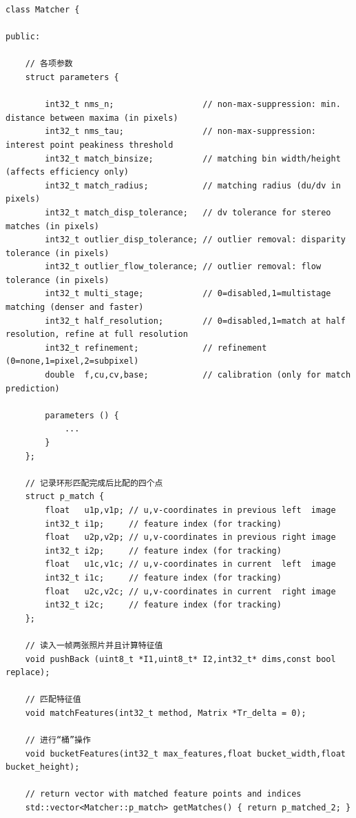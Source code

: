 \documentclass[UTF8]{ctexart}
\begin{document}
    \begin{verbatim}
class Matcher {

public:

    // 各项参数
    struct parameters {
    
        int32_t nms_n;                  // non-max-suppression: min. distance between maxima (in pixels)
        int32_t nms_tau;                // non-max-suppression: interest point peakiness threshold
        int32_t match_binsize;          // matching bin width/height (affects efficiency only)
        int32_t match_radius;           // matching radius (du/dv in pixels)
        int32_t match_disp_tolerance;   // dv tolerance for stereo matches (in pixels)
        int32_t outlier_disp_tolerance; // outlier removal: disparity tolerance (in pixels)
        int32_t outlier_flow_tolerance; // outlier removal: flow tolerance (in pixels)
        int32_t multi_stage;            // 0=disabled,1=multistage matching (denser and faster)
        int32_t half_resolution;        // 0=disabled,1=match at half resolution, refine at full resolution
        int32_t refinement;             // refinement (0=none,1=pixel,2=subpixel)
        double  f,cu,cv,base;           // calibration (only for match prediction)
        
        parameters () {
            ...
        }
    };

    // 记录环形匹配完成后比配的四个点
    struct p_match {
        float   u1p,v1p; // u,v-coordinates in previous left  image
        int32_t i1p;     // feature index (for tracking)
        float   u2p,v2p; // u,v-coordinates in previous right image
        int32_t i2p;     // feature index (for tracking)
        float   u1c,v1c; // u,v-coordinates in current  left  image
        int32_t i1c;     // feature index (for tracking)
        float   u2c,v2c; // u,v-coordinates in current  right image
        int32_t i2c;     // feature index (for tracking)
    };

    // 读入一帧两张照片并且计算特征值
    void pushBack (uint8_t *I1,uint8_t* I2,int32_t* dims,const bool replace);
    
    // 匹配特征值
    void matchFeatures(int32_t method, Matrix *Tr_delta = 0);

    // 进行“桶”操作
    void bucketFeatures(int32_t max_features,float bucket_width,float bucket_height);

    // return vector with matched feature points and indices
    std::vector<Matcher::p_match> getMatches() { return p_matched_2; }


\end{verbatim}
\end{document}

